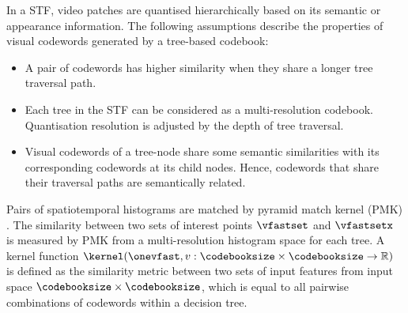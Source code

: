 In a STF, video patches are quantised hierarchically based on its semantic or appearance information. The following assumptions describe the properties of visual codewords generated by a tree-based codebook:
\begin{itemize}
	\item A pair of codewords has higher similarity when they share a longer tree traversal path. 
	\item Each tree in the STF can be considered as a multi-resolution codebook. Quantisation resolution is adjusted by the depth of tree traversal.
	\item Visual codewords of a tree-node share some semantic similarities with its corresponding codewords at its child nodes. Hence, codewords that share their traversal paths are semantically related. 
\end{itemize} 

Pairs of spatiotemporal histograms are matched by pyramid match kernel (PMK) \cite{Grauman2005}. 
The similarity between two sets of interest points $\vfastset$ and $\vfastsetx$ is measured by PMK from a multi-resolution histogram space for each tree. 
A kernel function $\kernel(\onevfast,v: \codebooksize \times \codebooksize \rightarrow \mathbb{R})$ is defined as the similarity metric between two sets of input features from input space $\codebooksize \times \codebooksize$, which is equal to all pairwise combinations of codewords within a decision tree.  

